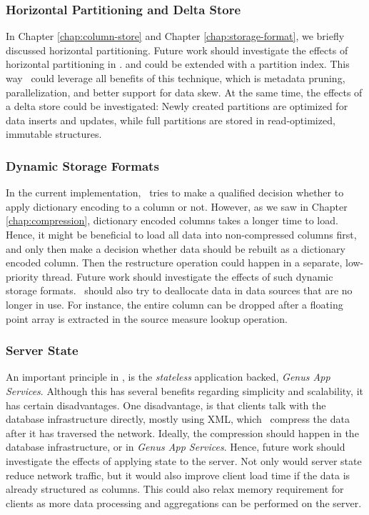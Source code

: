 \subsubsection{Horizontal Partitioning and Delta Store}
\label{ssub:Horizontal Partitioning and Delta Store}
In Chapter \ref{chap:column-store} and Chapter \ref{chap:storage-format}, we briefly discussed horizontal partitioning. Future work should investigate the effects of horizontal partitioning in \gap.  and  could be extended with a partition index. This way \gap~could leverage all benefits of this technique, which is metadata pruning, parallelization, and better support for data skew. At the same time, the effects of a delta store could be investigated: Newly created partitions are optimized for data inserts and updates, while full partitions are stored in read-optimized, immutable structures.

\subsubsection{Dynamic Storage Formats}
\label{ssub:Dynamic Storage Formats}
In the current implementation, \gap~tries to make a qualified decision whether to apply dictionary encoding to a column or not. However, as we saw in Chapter \ref{chap:compression}, dictionary encoded columns takes a longer time to load. Hence, it might be beneficial to load all data into non-compressed columns first, and only then make a decision whether data should be rebuilt as a dictionary encoded column. Then the restructure operation could happen in a separate, low-priority thread. Future work should investigate the effects of such dynamic storage formats. \gap~should also try to deallocate data in data sources that are no longer in use. For instance, the entire column can be dropped after a floating point array is extracted in the source measure lookup operation.

\subsubsection{Server State}
\label{ssub:Server State}
An important principle in \gap, is the \textit{stateless} application backed, \textit{Genus App Services}. Although this has several benefits regarding simplicity and scalability, it has certain disadvantages. One disadvantage, is that clients talk with the database infrastructure directly, mostly using XML, which \gap~compress the data after it has traversed the network. Ideally, the compression should happen in the database infrastructure, or in \textit{Genus App Services}. Hence, future work should investigate the effects of applying state to the server. Not only would server state reduce network traffic, but it would also improve client load time if the data is already structured as columns. This could also relax memory requirement for clients as more data processing and aggregations can be performed on the server.

